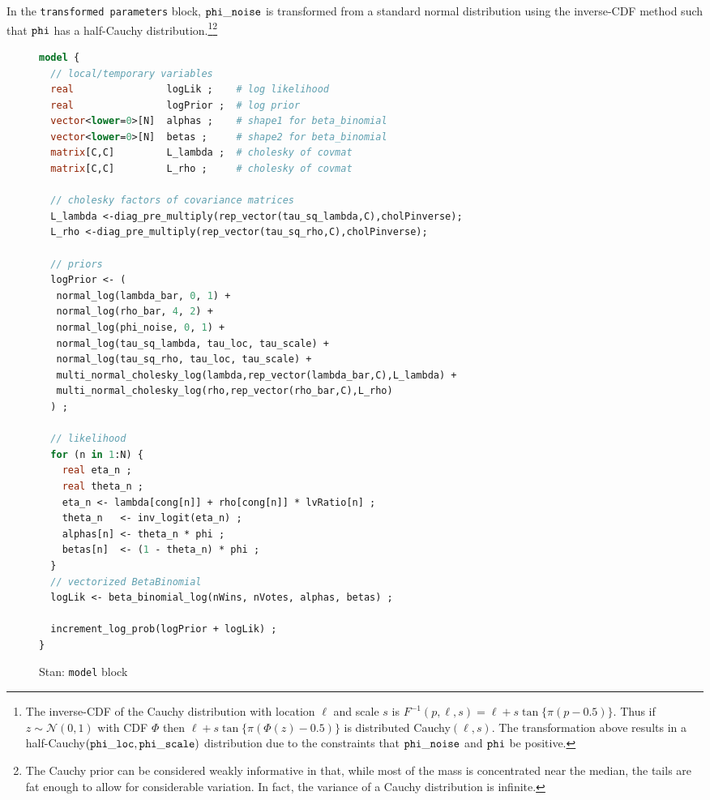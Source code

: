 In the {\tt transformed parameters} block, ${\tt phi\_noise}$ is transformed from a standard normal distribution using the inverse-CDF method such that ${\tt phi}$ has a half-Cauchy distribution.\footnote{The inverse-CDF of the Cauchy distribution with location $\ell$ and scale $s$ is $F^{-1}(p, \ell,s)  = \ell + s \tan{\{ \pi (p - 0.5)\}}$. Thus if $z \sim \mathcal{N}(0,1)$ with CDF $\Phi$ then $\ell + s \tan{\{ \pi (\Phi(z) - 0.5)\}}$ is distributed Cauchy$(\ell, s)$. The transformation above results in a half-Cauchy$({\tt phi\_loc}, {\tt phi\_scale})$ distribution due to the constraints that ${\tt phi\_noise}$ and ${\tt phi}$ be positive.}\footnote{The Cauchy prior can be considered weakly informative in that, while most of the mass is concentrated near the median, the tails are fat enough to allow for considerable variation. In fact, the variance of a Cauchy distribution is infinite.}




\begin{figure}[p]
\begin{lstlisting}[language=Stan, frame=trBL]
model {
  // local/temporary variables
  real                logLik ;    # log likelihood
  real                logPrior ;  # log prior
  vector<lower=0>[N]  alphas ;    # shape1 for beta_binomial 
  vector<lower=0>[N]  betas ;     # shape2 for beta_binomial
  matrix[C,C]         L_lambda ;  # cholesky of covmat
  matrix[C,C]         L_rho ;     # cholesky of covmat
  
  // cholesky factors of covariance matrices
  L_lambda <-diag_pre_multiply(rep_vector(tau_sq_lambda,C),cholPinverse);
  L_rho <-diag_pre_multiply(rep_vector(tau_sq_rho,C),cholPinverse);
  
  // priors
  logPrior <- (
   normal_log(lambda_bar, 0, 1) + 
   normal_log(rho_bar, 4, 2) + 
   normal_log(phi_noise, 0, 1) +
   normal_log(tau_sq_lambda, tau_loc, tau_scale) +
   normal_log(tau_sq_rho, tau_loc, tau_scale) +
   multi_normal_cholesky_log(lambda,rep_vector(lambda_bar,C),L_lambda) +
   multi_normal_cholesky_log(rho,rep_vector(rho_bar,C),L_rho) 
  ) ;
  
  // likelihood
  for (n in 1:N) {
    real eta_n ;
    real theta_n ;
    eta_n <- lambda[cong[n]] + rho[cong[n]] * lvRatio[n] ;
    theta_n   <- inv_logit(eta_n) ;    
    alphas[n] <- theta_n * phi ;
    betas[n]  <- (1 - theta_n) * phi ;
  }
  // vectorized BetaBinomial
  logLik <- beta_binomial_log(nWins, nVotes, alphas, betas) ; 
  
  increment_log_prob(logPrior + logLik) ; 
}
\end{lstlisting}
\caption{Stan: {\tt model} block}
\label{stan_model}
\end{figure}
%


